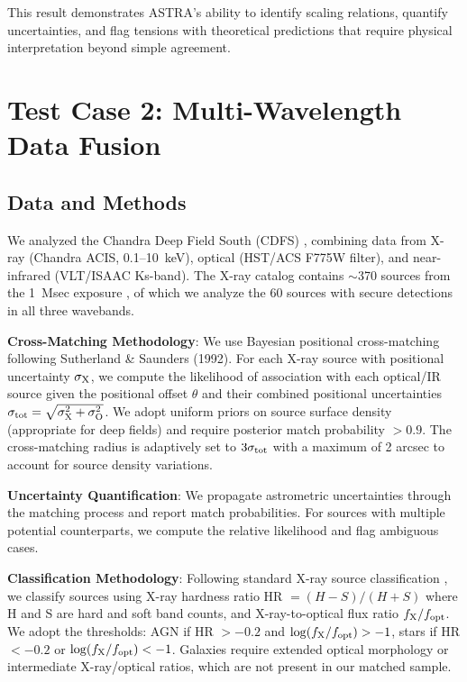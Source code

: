 \documentclass[usenatbib]{rasti}
\begin{document}
This result demonstrates ASTRA's ability to identify scaling relations, quantify uncertainties, and flag tensions with theoretical predictions that require physical interpretation beyond simple agreement.

\section{Test Case 2: Multi-Wavelength Data Fusion}

\subsection{Data and Methods}

We analyzed the Chandra Deep Field South (CDFS) \cite{giacconi2001}, combining data from X-ray (Chandra ACIS, 0.1--10~keV), optical (HST/ACS F775W filter), and near-infrared (VLT/ISAAC Ks-band). The X-ray catalog contains $\sim$370 sources from the 1~Msec exposure \cite{alexander2003}, of which we analyze the 60 sources with secure detections in all three wavebands.

\textbf{Cross-Matching Methodology}: We use Bayesian positional cross-matching following Sutherland \& Saunders (1992)\cite{sutherland1992}. For each X-ray source with positional uncertainty $\sigma_{\rm X}$, we compute the likelihood of association with each optical/IR source given the positional offset $\theta$ and their combined positional uncertainties $\sigma_{\rm tot} = \sqrt{\sigma_{\rm X}^2 + \sigma_{\rm O}^2}$. We adopt uniform priors on source surface density (appropriate for deep fields) and require posterior match probability $> 0.9$. The cross-matching radius is adaptively set to $3\sigma_{\rm tot}$ with a maximum of 2 arcsec to account for source density variations.

\textbf{Uncertainty Quantification}: We propagate astrometric uncertainties through the matching process and report match probabilities. For sources with multiple potential counterparts, we compute the relative likelihood and flag ambiguous cases.

\textbf{Classification Methodology}: Following standard X-ray source classification \cite{hornschemeier2001,bauer2004}, we classify sources using X-ray hardness ratio HR $= (H-S)/(H+S)$ where H and S are hard and soft band counts, and X-ray-to-optical flux ratio $f_{\rm X}/f_{\rm opt}$. We adopt the thresholds: AGN if HR $> -0.2$ and $\log(f_{\rm X}/f_{\rm opt}) > -1$, stars if HR $< -0.2$ or $\log(f_{\rm X}/f_{\rm opt}) < -1$. Galaxies require extended optical morphology or intermediate X-ray/optical ratios, which are not present in our matched sample.
\end{document}
